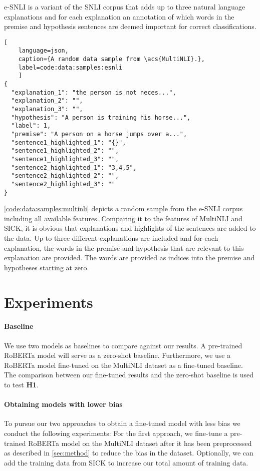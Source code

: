 \documentclass[12pt,a4paper]{article}
\begin{document}
\Acf{e-SNLI} \parencite{esnli} is a variant of the \acs{SNLI} \parencite{snli} corpus that adds up to three natural language explanations and for each explanation an annotation of which words in the premise and hypothesis sentences are deemed important for correct classifications.

\begin{lstlisting}[
    language=json,
    caption={A random data sample from \acs{MultiNLI}.},
    label=code:data:samples:esnli
    ]
{
  "explanation_1": "the person is not neces...",
  "explanation_2": "",
  "explanation_3": "",
  "hypothesis": "A person is training his horse...",
  "label": 1,
  "premise": "A person on a horse jumps over a...",
  "sentence1_highlighted_1": "{}",
  "sentence1_highlighted_2": "",
  "sentence1_highlighted_3": "",
  "sentence2_highlighted_1": "3,4,5",
  "sentence2_highlighted_2": "",
  "sentence2_highlighted_3": ""
}
\end{lstlisting}

\autoref{code:data:samples:multinli} depicts a random sample from the \acs{e-SNLI} corpus including all available features. Comparing it to the features of \acs{MultiNLI} and \acs{SICK}, it is obvious that explanations and highlights of the sentences are added to the data. Up to three different explanations are included and for each explanation, the words in the premise and hypothesis that are relevant to this explanation are provided. The words are provided as indices into the premise and hypotheses starting at zero.

\section{Experiments}
\paragraph{Baseline} We use two models as baselines to compare against our results. A pre-trained \ac{RoBERTa} model will serve as a zero-shot baseline. Furthermore, we use a \ac{RoBERTa} model fine-tuned on the \ac{MultiNLI} dataset as a fine-tuned baseline. The comparison between our fine-tuned results and the zero-shot baseline is used to test \textbf{H1}.

\paragraph{Obtaining models with lower bias} To pursue our two approaches to obtain a fine-tuned model with less bias we conduct the following experiments: For the first approach, we fine-tune a pre-trained \ac{RoBERTa} model on the \ac{MultiNLI} dataset after it has been preprocessed as described in \autoref{sec:method} to reduce the bias in the dataset. Optionally, we can add the training data from \ac{SICK} to increase our total amount of training data. 
\end{document}
